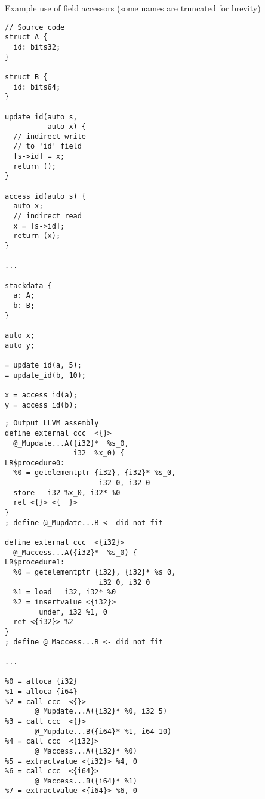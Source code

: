 \begin{codex}
    \caption{Example use of field accessors (some names are truncated for brevity)}
    \label{lst:fieldAccessors}
    \begin{center}
    \begin{minipage}{0.45\linewidth}
    \begin{lstlisting}[basicstyle=\scriptsize\ttfamily]
// Source code
struct A {
  id: bits32;
}

struct B {
  id: bits64;
}

update_id(auto s,
          auto x) {
  // indirect write
  // to 'id' field
  [s->id] = x;
  return ();
}

access_id(auto s) {
  auto x;
  // indirect read
  x = [s->id];
  return (x);
}

...

stackdata {
  a: A;
  b: B;
}

auto x;
auto y;

= update_id(a, 5);
= update_id(b, 10);

x = access_id(a);
y = access_id(b);
    \end{lstlisting}
    \end{minipage}%
    \begin{minipage}{0.55\linewidth}
    \begin{lstlisting}[style=llvmStyle,basicstyle=\scriptsize\ttfamily]
; Output LLVM assembly
define external ccc  <{}>
  @_Mupdate...A({i32}*  %s_0,
                i32  %x_0) {
LR$procedure0:
  %0 = getelementptr {i32}, {i32}* %s_0,
                      i32 0, i32 0
  store   i32 %x_0, i32* %0
  ret <{}> <{  }>
}
; define @_Mupdate...B <- did not fit

define external ccc  <{i32}>
  @_Maccess...A({i32}*  %s_0) {
LR$procedure1:
  %0 = getelementptr {i32}, {i32}* %s_0,
                      i32 0, i32 0
  %1 = load   i32, i32* %0
  %2 = insertvalue <{i32}>
        undef, i32 %1, 0
  ret <{i32}> %2
}
; define @_Maccess...B <- did not fit

...

%0 = alloca {i32}
%1 = alloca {i64}
%2 = call ccc  <{}>
       @_Mupdate...A({i32}* %0, i32 5)
%3 = call ccc  <{}>
       @_Mupdate...B({i64}* %1, i64 10)
%4 = call ccc  <{i32}>
       @_Maccess...A({i32}* %0)
%5 = extractvalue <{i32}> %4, 0
%6 = call ccc  <{i64}>
       @_Maccess...B({i64}* %1)
%7 = extractvalue <{i64}> %6, 0

    \end{lstlisting}
    \end{minipage}
    \end{center}
\end{codex}

